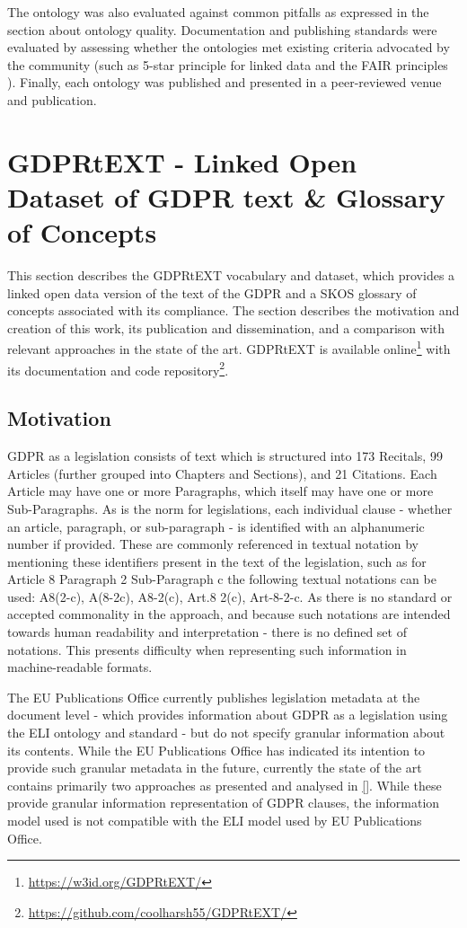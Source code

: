 The ontology was also evaluated against common pitfalls as expressed in the section about ontology quality. Documentation and publishing standards were evaluated by assessing whether the ontologies met existing criteria advocated by the community (such as 5-star principle for linked data \cite{} and the FAIR principles \cite{}). Finally, each ontology was published and presented in a peer-reviewed venue and publication.

\section{GDPRtEXT - Linked Open Dataset of GDPR text \& Glossary of Concepts}\label{sec:voc:GDPRtEXT}

This section describes the GDPRtEXT vocabulary and dataset, which provides a linked open data version of the text of the GDPR and a SKOS glossary of concepts associated with its compliance. The section describes the motivation and creation of this work, its publication and dissemination, and a comparison with relevant approaches in the state of the art. GDPRtEXT is available online\footnote{\url{https://w3id.org/GDPRtEXT/}} with its documentation and code repository\footnote{\url{https://github.com/coolharsh55/GDPRtEXT/}}.

\subsection{Motivation}
GDPR as a legislation consists of text which is structured into 173 Recitals, 99 Articles (further grouped into Chapters and Sections), and 21 Citations. Each Article may have one or more Paragraphs, which itself may have one or more Sub-Paragraphs. As is the norm for legislations, each individual clause - whether an article, paragraph, or sub-paragraph - is identified with an alphanumeric number if provided. These are commonly referenced in textual notation by mentioning these identifiers present in the text of the legislation, such as for Article 8 Paragraph 2 Sub-Paragraph c the following textual notations can be used: A8(2-c), A(8-2c), A8-2(c), Art.8 2(c), Art-8-2-c. As there is no standard or accepted commonality in the approach, and because such notations are intended towards human readability and interpretation - there is no defined set of notations. This presents difficulty when representing such information in machine-readable formats.

The EU Publications Office currently publishes legislation metadata at the document level - which provides information about GDPR as a legislation using the ELI ontology and standard \cite{} - but do not specify granular information about its contents. While the EU Publications Office has indicated its intention to provide such granular metadata in the future, currently the state of the art contains primarily two approaches as presented and analysed in \autoref{}. While these provide granular information representation of GDPR clauses, the information model used is not compatible with the ELI model used by EU Publications Office.

